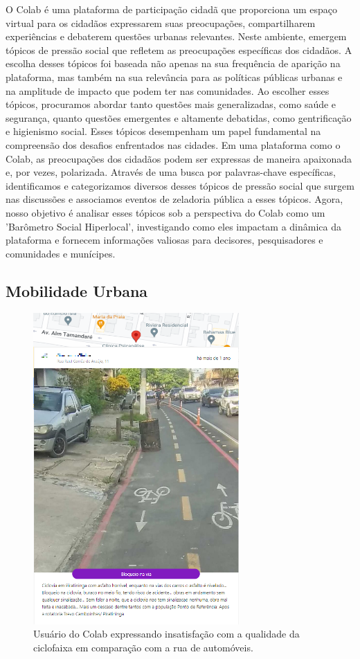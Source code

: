 O Colab é uma plataforma de participação cidadã que proporciona um espaço virtual para os cidadãos expressarem suas preocupações, compartilharem experiências e debaterem questões urbanas relevantes. Neste ambiente, emergem tópicos de pressão social que refletem as preocupações específicas dos cidadãos. A escolha desses tópicos foi baseada não apenas na sua frequência de aparição na plataforma, mas também na sua relevância para as políticas públicas urbanas e na amplitude de impacto que podem ter nas comunidades. Ao escolher esses tópicos, procuramos abordar tanto questões mais generalizadas, como saúde e segurança, quanto questões emergentes e altamente debatidas, como gentrificação e higienismo social. Esses tópicos desempenham um papel fundamental na compreensão dos desafios enfrentados nas cidades. Em uma plataforma como o Colab, as preocupações dos cidadãos podem ser expressas de maneira apaixonada e, por vezes, polarizada. Através de uma busca por palavras-chave específicas, identificamos e categorizamos diversos desses tópicos de pressão social que surgem nas discussões e associamos eventos de zeladoria pública a esses tópicos. Agora, nosso objetivo é analisar esses tópicos sob a perspectiva do Colab como um 'Barômetro Social Hiperlocal', investigando como eles impactam a dinâmica da plataforma e fornecem informações valiosas para decisores, pesquisadores e comunidades e munícipes.

\subsection{Mobilidade Urbana}

\begin{figure}[htb]
	\centering
	\includegraphics[width=0.7\textwidth]{images/colab_posts_mobility.png}
	\caption{Usuário do Colab expressando insatisfação com a qualidade da ciclofaixa em comparação com a rua de automóveis.}
	\label{fig:colab_posts_mobility}
\end{figure}


